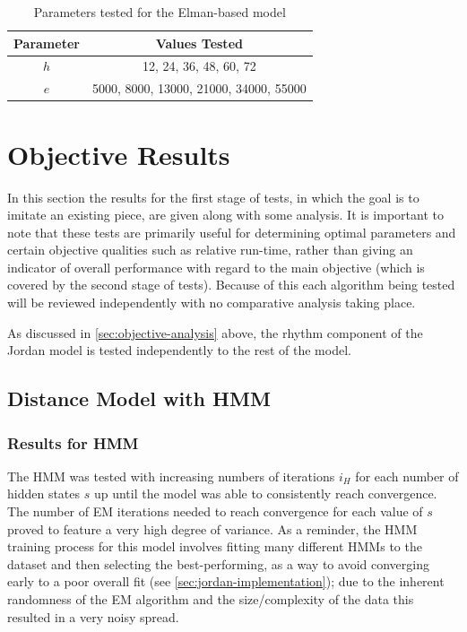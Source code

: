\documentclass[ author={Stephen Livermore-Tozer},
				supervisor={Dr. Peter Flach},
				degree={MEng},
				title={Algorithmic Co-composition Using Machine Learning},
				subtitle={},
				type={research},
				year={2016} ]{dissertation}
\begin{document}
	\begin{table}[h]
		\begin{center}
			\begin{tabular}{cc}
				\toprule
				Parameter & Values Tested\\
				\hline
				$h$ & 12, 24, 36, 48, 60, 72\\
				$e$ & 5000, 8000, 13000, 21000, 34000, 55000\\
				\bottomrule
			\end{tabular}
		\end{center}
		\caption{Parameters tested for the Elman-based model}
		\label{tab:elman-parameters}
	\end{table}
	
	\section{Objective Results}

	In this section the results for the first stage of tests, in which the goal is to imitate an existing piece, are given along with some analysis. It is important to note that these tests are primarily useful for determining optimal parameters and certain objective qualities such as relative run-time, rather than giving an indicator of overall performance with regard to the main objective (which is covered by the second stage of tests). Because of this each algorithm being tested will be reviewed independently with no comparative analysis taking place.
	
	As discussed in \ref{sec:objective-analysis} above, the rhythm component of the Jordan model is tested independently to the rest of the model.
	
	\subsection{Distance Model with HMM}
	
	\subsubsection{Results for HMM}
	
	The HMM was tested with increasing numbers of iterations $i_H$ for each number of hidden states $s$ up until the model was able to consistently reach convergence. The number of EM iterations needed to reach convergence for each value of $s$ proved to feature a very high degree of variance. As a reminder, the HMM training process for this model involves fitting many different HMMs to the dataset and then selecting the best-performing, as a way to avoid converging early to a poor overall fit (see \ref{sec:jordan-implementation}); due to the inherent randomness of the EM algorithm and the size/complexity of the data this resulted in a very noisy spread.
	
\end{document}
